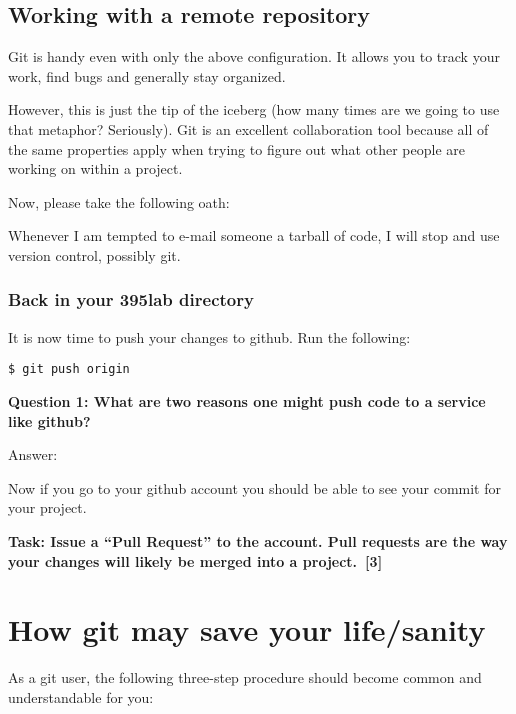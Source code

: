 \documentclass[letterpaper]{article}
\begin{document}
\subsection*{Working with a remote repository}

Git is handy even with only the above configuration.  It allows you to track
your work, find bugs and generally stay organized.

However, this is just the tip of the iceberg (how many times are we going to
use that metaphor? Seriously).  Git is an excellent collaboration tool because
all of the same properties apply when trying to figure out what other people
are working on within a project.

Now, please take the following oath:

\vspace{0.5cm}
{\large Whenever I am tempted to e-mail someone a tarball of code, I will stop
and use version control, possibly git.}
\vspace{0.5cm}

\subsubsection*{Back in your 395lab directory}

It is now time to push your changes to github.
Run the following:

\begin{verbatim}
$ git push origin
\end{verbatim}

{\bf Question 1: What are two reasons one might push code to a service
like github?}

\noindent
Answer:
\vspace{2in}

Now if you go to your github account you should be able to see your commit for your project.

\vspace{\baselineskip}
\noindent
{\bf Task: Issue a ``Pull Request'' to the account. Pull requests are the way your changes will likely be merged into a project.~[3]}

\section*{How git may save your life/sanity}

As a git user, the following three-step procedure should become
common and understandable for you:
\end{document}
